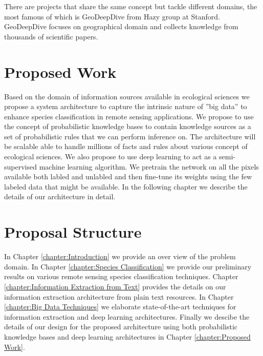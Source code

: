 There are projects that share the same concept but tackle different domains, the most famous of which is GeoDeepDive from Hazy group at Stanford. GeoDeepDive focuses on geographical domain and collects knowledge from thousands of scientific papers.

\section{Proposed Work}

Based on the domain of information sources available in ecological sciences we propose a system architecture to capture the intrinsic nature of ''big data'' to enhance species classification in remote sensing applications. We propose to use the concept of probabilistic knowledge bases to contain knowledge sources as a set of probabilistic rules that we can perform inference on. The architecture will be scalable able to handle millions of facts and rules about various concept of ecological sciences. We also propose to use deep learning to act as a semi-supervised machine learning algorithm. We pretrain the network on all the pixels available both labled and unlabled and then fine-tune its weights using the few labeled data that might be available. In the following chapter we describe the details of our architecture in detail. 

\section{Proposal Structure}

In Chapter \ref{chapter:Introduction} we provide an over view of the problem domain. In Chapter \ref{chapter:Species Classification} we provide our preliminary results on various remote sensing species classification techniques. Chapter \ref{chapter:Information Extraction from Text} provides the details on our information extraction architecture from plain text resources. In Chapter \ref{chapter:Big Data Techniques} we elaborate state-of-the-art techniques for information extraction and deep learning architectures. Finally we descibe the details of our design for the proposed architecture using both probabilistic knowledge bases and deep learning architectures in Chapter \ref{chapter:Proposed Work}. 



 
